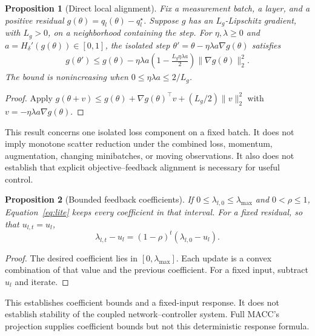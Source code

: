 \documentclass[a4paper,fleqn]{cas-dc}
\newtheorem{proposition}{Proposition}
\begin{document}
\begin{proposition}[Direct local alignment]\label{prop:local}
Fix a measurement batch, a layer, and a positive residual
$g(\theta)=q_l(\theta)-q_l^\star$. Suppose $g$ has an
$L_g$-Lipschitz gradient, with $L_g>0$, on a neighborhood
containing the step. For $\eta,\lambda\ge0$ and
$a=H_\delta'(g(\theta))\in[0,1]$, the isolated step
$\theta'=\theta-\eta\lambda a\nabla g(\theta)$ satisfies
\begin{align}
 g(\theta')\le g(\theta)
 -\eta\lambda a
 \left(1-\frac{L_g\eta\lambda a}{2}\right)
 \|\nabla g(\theta)\|_2^2.
 \label{eq:alignment_bound}
\end{align}
The bound is nonincreasing when
$0\le\eta\lambda a\le2/L_g$.
\end{proposition}
\begin{proof}
Apply
$g(\theta+v)\le g(\theta)+\nabla g(\theta)^\top v+
(L_g/2)\|v\|_2^2$
with $v=-\eta\lambda a\nabla g(\theta)$.
\end{proof}
This result concerns one isolated loss component on a fixed batch.
It does not imply monotone scatter reduction under the combined
loss, momentum, augmentation, changing minibatches, or moving
observations. It also does not establish that explicit
objective--feedback alignment is necessary for useful control.

\begin{proposition}[Bounded feedback coefficients]\label{prop:bounded}
If $0\le\lambda_{l,0}\le\lambda_{\max}$ and $0<\rho\le1$,
Equation~\eqref{eq:lite} keeps every coefficient in that interval.
For a fixed residual, so that $u_{l,t}=u_l$,
\begin{equation}
 \lambda_{l,t}-u_l=(1-\rho)^t(\lambda_{l,0}-u_l).
\end{equation}
\end{proposition}
\begin{proof}
The desired coefficient lies in $[0,\lambda_{\max}]$.
Each update is a convex combination of that value and the previous
coefficient. For a fixed input, subtract $u_l$ and iterate.
\end{proof}
This establishes coefficient bounds and a fixed-input response.
It does not establish stability of the coupled network--controller
system. Full MACC's projection supplies coefficient bounds but
not this deterministic response formula.
\end{document}
